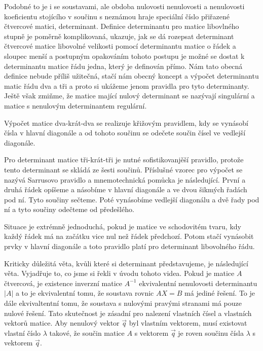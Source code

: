 \documentclass[12pt]{article}
\begin{document}
Podobné to je i se soustavami, ale obdoba nulovosti nenulovosti a nenulovosti koeficientu stojícího v součinu s neznámou hraje speciální číslo přiřazené čtvercové matici, determinant. Definice determinantu pro matice libovlného stupně je poměrně komplikovaná, ukazuje, jak se dá rozepsat determinant čtvercové matice libovolné velikosti pomocí determinantu matice o řádek a sloupec menší a postupným opakováním tohoto postupu je možné se dostat k determinantu matice řádu jedna, který je definován přímo. Nám tato obecná definice nebude příliš užitečná, stačí nám obecný koncept a výpočet determinantu matic řádu dva a tři a proto si ukážeme jenom pravidla pro tyto determinanty. Ještě však zmiňme, že matice mající nulový determinant se nazývají singulární a matice s nenulovým determinantem regulární.

Výpočet matice dva-krát-dva se realizuje křižovým pravidlem, kdy se vynásobí čísla v hlavní diagonále a od tohoto součinu se odečete součin čísel ve vedlejší diagonále.

Pro determinant matice tři-krát-tři je nutné sofistikovanjěší pravidlo, protože tento determinant se skládá ze šesti součinů. Příslušné vzorec pro výpočet se nazývá Sarrusovo pravidlo a mnemotechnická pomůcka je následující. První a druhá řádek opíšeme a násobíme v hlavní diagonále a ve dvou šikmých řadách pod ní. Tyto součiny sečteme. Poté vynásobíme vedlejší diagonálu a dvě řady pod ní a tyto součiny odečteme od předešlého.

Situace je extrémně jednoduchá, pokud je matice ve schodovitém tvaru, kdy každý řádek má na začátku vice nul než řádek předchozí. Potom stačí vynásobit prvky v hlavní diagonále a toto pravidlo platí pro determinant libovolného řádu.

Kriticky důležitá věta, kvůli které si determinant představujeme, je následující věta. Vyjadřuje to, co jsme si řekli v úvodu tohoto videa. Pokud je matice $A$ čtvercová, je existence inverzní matice $A^{-1}$ ekvivalentní nenulovosti determinantu $|A|$ a to je ekvivalentní tomu, že soustava rovnic $AX=B$ má jediné řešení. To je dále ekvivaltentní tomu, že soustava s nulovými pravými stranami má pouze nulové řešení. Tato skutečnost je zásadní pro nalezení vlastních čísel a vlastních vektorů matice. Aby nenulový vektor $\vec q$ byl vlastním vektorem, musí existovat vlastní číslo $ \lambda$ takové, že součin matice $A$ s vektorem $\vec q$ je roven součinu čísla $\lambda$ s vektorem $\vec q$.
\end{document}

